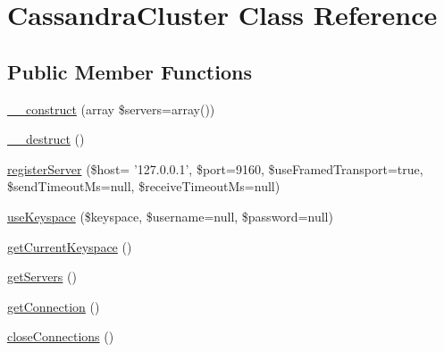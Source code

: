 \hypertarget{classCassandraCluster}{
\section{CassandraCluster Class Reference}
\label{classCassandraCluster}
}
\subsection*{Public Member Functions}
\begin{DoxyCompactItemize}
\item 
\hyperlink{classCassandraCluster_a6ca88a787d742b39e43b6a5fefabc633}{\_\-\_\-construct} (array \$servers=array())
\item 
\hyperlink{classCassandraCluster_a4ce9e28f647bbbbb253273c3e0fa377a}{\_\-\_\-destruct} ()
\item 
\hyperlink{classCassandraCluster_a49baa9fac921644a5ba10f98c4a7412d}{registerServer} (\$host= '127.0.0.1', \$port=9160, \$useFramedTransport=true, \$sendTimeoutMs=null, \$receiveTimeoutMs=null)
\item 
\hyperlink{classCassandraCluster_a1044f6f79a82fbb33aa6dd0374cac07a}{useKeyspace} (\$keyspace, \$username=null, \$password=null)
\item 
\hyperlink{classCassandraCluster_a0cc3add750920cad51b03676b549e256}{getCurrentKeyspace} ()
\item 
\hyperlink{classCassandraCluster_af213845fa6bfb0e6a986fb671be28552}{getServers} ()
\item 
\hyperlink{classCassandraCluster_a27ec1b4718ca21a87a791035130d0746}{getConnection} ()
\item 
\hyperlink{classCassandraCluster_afbff3180c5d4bb74c8b230436349d460}{closeConnections} ()
\end{DoxyCompactItemize}

